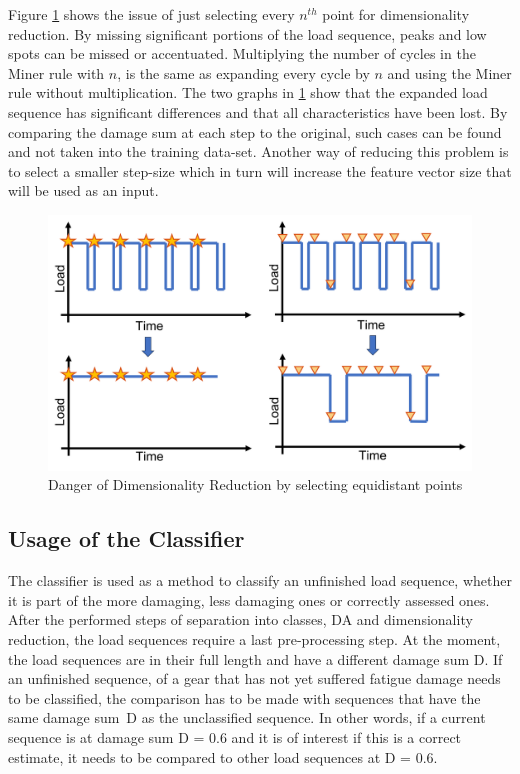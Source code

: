 Figure \ref{fig:UL} shows the issue of just selecting every \(n^{th}\) point for dimensionality reduction. By missing significant portions of the load sequence, peaks and low spots can be missed or accentuated. Multiplying the number of cycles in the Miner rule with \(n\), is the same as expanding every cycle by \(n\) and using the Miner rule without multiplication. The two graphs in \ref{fig:UL} show that the expanded load sequence has significant differences and that all characteristics have been lost. By comparing the damage sum at each step to the original, such cases can be found and not taken into the training data-set. Another way of reducing this problem is to select a smaller step-size which in turn will increase the feature vector size that will be used as an input. 

\begin{figure}[H]
	\centering
	\includegraphics[width=0.8\linewidth]{IMGs/Unlucky.png}
	\caption{Danger of Dimensionality Reduction by selecting equidistant points}
	\label{fig:UL}
\end{figure}
 
\subsection{Usage of the Classifier}
The classifier is used as a method to classify an unfinished load sequence, whether it is part of the more damaging, less damaging ones or correctly assessed ones. After the performed steps of separation into classes, DA and dimensionality reduction, the load sequences require a last pre-processing step. At the moment, the load sequences are in their full length and have a different damage sum D.
If an unfinished sequence, of a gear that has not yet suffered fatigue damage needs to be classified, the comparison has to be made with sequences that have the same damage sum~D as the unclassified sequence. In other words, if a current sequence is at damage sum D = 0.6 and it is of interest if this is a correct estimate, it needs to be compared to other load sequences at D = 0.6.
 
